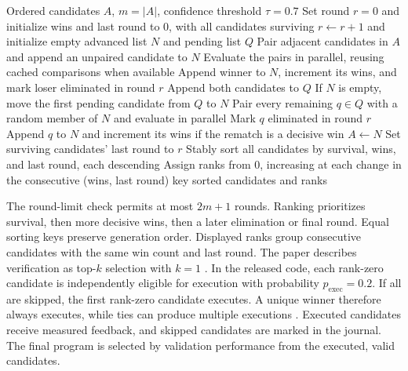 \begin{algorithm}[H]
\caption{Confidence-gated tournament (released implementation)}\label{alg:tournament}
\small
\begin{algorithmic}[1]
\Require Ordered candidates $A$, $m=|A|$, confidence threshold $\tau=0.7$
\State Set round $r=0$ and initialize wins and last round to 0, with all candidates surviving
\State $r\gets r+1$ and initialize empty advanced list $N$ and pending list $Q$
\State Pair adjacent candidates in $A$ and append an unpaired candidate to $N$
\State Evaluate the pairs in parallel, reusing cached comparisons when available
\State Append winner to $N$, increment its wins, and mark loser eliminated in round $r$
\Else
\State Append both candidates to $Q$
\EndIf
\EndFor
\State If $N$ is empty, move the first pending candidate from $Q$ to $N$
\State Pair every remaining $q\in Q$ with a random member of $N$ and evaluate in parallel
\State Mark $q$ eliminated in round $r$
\Else
\State Append $q$ to $N$ and increment its wins if the rematch is a decisive win
\EndIf
\EndFor
\State $A\gets N$ 
\EndWhile
\State Set surviving candidates' last round to $r$
\State Stably sort all candidates by survival, wins, and last round, each descending
\State Assign ranks from 0, increasing at each change in the consecutive (wins, last round) key
\State \Return sorted candidates and ranks
\end{algorithmic}
\end{algorithm}

The round-limit check permits at most $2m+1$ rounds. Ranking prioritizes survival, then more decisive wins, then a later elimination or final round. Equal sorting keys preserve generation order. Displayed ranks group consecutive candidates with the same win count and last round. The paper describes verification as top-$k$ selection with $k=1$ \citep[Section~6.2]{zheng2026predict}. In the released code, each rank-zero candidate is independently eligible for execution with probability $p_{\mathrm{exec}}=0.2$. If all are skipped, the first rank-zero candidate executes. A unique winner therefore always executes, while ties can produce multiple executions \citep{foreagentcode}. Executed candidates receive measured feedback, and skipped candidates are marked in the journal. The final program is selected by validation performance from the executed, valid candidates.

